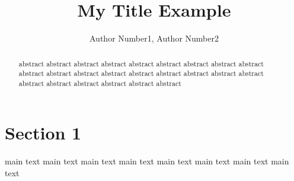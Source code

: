 \documentclass{article}
\begin{document}
\title{My Title Example}
\author{Author Number1, Author Number2}
\date{}
\maketitle

\begin{abstract}

abstract abstract abstract abstract abstract abstract abstract abstract 
abstract abstract abstract abstract abstract abstract abstract abstract 
abstract abstract abstract abstract abstract abstract abstract abstract

\end{abstract}

\section{Section 1}

main text main text main text main text main text main text main text main text 
\end{document}
